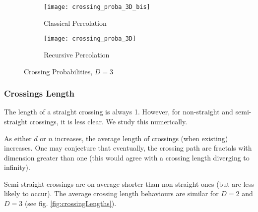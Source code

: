 \begin{figure}[!h]
	\begin{subfigure}{0.45\linewidth}
		\texttt{[image: crossing\_proba\_3D\_bis]}
		\centering
		\captionsetup{justification=centering}
		\caption{Classical Percolation}
	\end{subfigure}
	\hspace{0.04\linewidth}
	\begin{subfigure}{0.45\linewidth}
		\texttt{[image: crossing\_proba\_3D]}
		\centering
		\captionsetup{justification=centering}
		\caption{Recursive Percolation}
	\end{subfigure}
	\caption{Crossing Probabilities, $D=3$}
	\label{fig:crossingProbabilities3D}
\end{figure}

\subsubsection{Crossings Length}
The length of a straight crossing is always 1.
However, for non-straight and semi-straight crossings, it is less clear.
We study this numerically.

As either $d$ or $n$ increases, the average  length of crossings (when existing) increases.
One may conjecture that eventually, the crossing path are fractals with dimension greater than one (this would agree with a crossing length diverging to infinity).

Semi-straight crossings are on average shorter than non-straight ones (but are less likely to occur).
The average crossing length behaviours are similar for $D=2$ and $D=3$ (see fig. \ref{fig:crossingLengths}).

